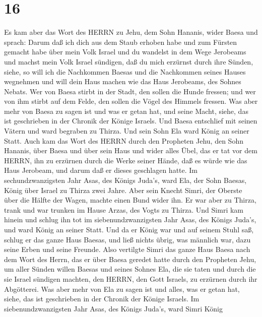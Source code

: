 \hypertarget{section-15}{%
\section{16}\label{section-15}}

 Es kam aber das Wort des HERRN zu Jehu, dem Sohn Hananis,
wider Baesa und sprach:  Darum daß ich dich aus dem Staub
erhoben habe und zum Fürsten gemacht habe über mein Volk Israel und du
wandelst in dem Wege Jerobeams und machst mein Volk Israel sündigen, daß
du mich erzürnst durch ihre Sünden,  siehe, so will ich die
Nachkommen Baesas und die Nachkommen seines Hauses wegnehmen und will
dein Haus machen wie das Haus Jerobeams, des Sohnes Nebats. 
Wer von Baesa stirbt in der Stadt, den sollen die Hunde fressen; und wer
von ihm stirbt auf dem Felde, den sollen die Vögel des Himmels fressen.
 Was aber mehr von Baesa zu sagen ist und was er getan hat,
und seine Macht, siehe, das ist geschrieben in der Chronik der Könige
Israels.  Und Baesa entschlief mit seinen Vätern und ward
begraben zu Thirza. Und sein Sohn Ela ward König an seiner Statt.
 Auch kam das Wort des HERRN durch den Propheten Jehu, den
Sohn Hananis, über Baesa und über sein Haus und wider alles Übel, das er
tat vor dem HERRN, ihn zu erzürnen durch die Werke seiner Hände, daß es
würde wie das Haus Jerobeam, und darum daß er dieses geschlagen hatte.
 Im sechundzwanzigsten Jahr Asas, des Königs Juda's, ward
Ela, der Sohn Baesas, König über Israel zu Thirza zwei Jahre.
 Aber sein Knecht Simri, der Oberste über die Hälfte der
Wagen, machte einen Bund wider ihn. Er war aber zu Thirza, trank und war
trunken im Hause Arzas, des Vogts zu Thirza.  Und Simri kam
hinein und schlug ihn tot im siebenundzwanzigsten Jahr Asas, des Königs
Juda's, und ward König an seiner Statt.  Und da er König
war und auf seinem Stuhl saß, schlug er das ganze Haus Baesas, und ließ
nichts übrig, was männlich war, dazu seine Erben und seine Freunde.
 Also vertilgte Simri das ganze Haus Baesa nach dem Wort
des Herrn, das er über Baesa geredet hatte durch den Propheten Jehu,
 um aller Sünden willen Baesas und seines Sohnes Ela, die
sie taten und durch die sie Israel sündigen machten, den HERRN, den Gott
Israels, zu erzürnen durch ihr Abgötterei.  Was aber mehr
von Ela zu sagen ist und alles, was er getan hat, siehe, das ist
geschrieben in der Chronik der Könige Israels.  Im
siebenundzwanzigsten Jahr Asas, des Königs Juda's, ward Simri König
